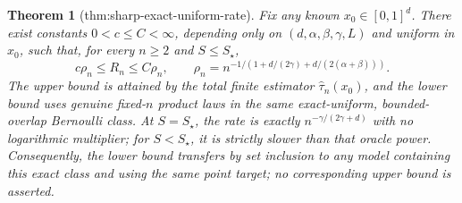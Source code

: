 \documentclass{article}
\newtheorem{theorem}{Theorem}
\begin{document}
\begin{theorem}[thm:sharp-exact-uniform-rate]\label{thm:sharp-exact-uniform-rate}
Fix any known \(x_0\in[0,1]^d\).  There exist constants \(0<c\le C<\infty\), depending only on \((d,\alpha,\beta,\gamma,L)\) and uniform in \(x_0\), such that, for every \(n\ge2\) and \(S\le S_\star\),
\[
c\rho_n\le R_n\le C\rho_n,\qquad
\rho_n=n^{-1/(1+d/(2\gamma)+d/(2(\alpha+\beta)))}.
\]
The upper bound is attained by the total finite estimator \(\widehat\tau_n(x_0)\), and the lower bound uses genuine fixed-\(n\) product laws in the same exact-uniform, bounded-overlap Bernoulli class.  At \(S=S_\star\), the rate is exactly \(n^{-\gamma/(2\gamma+d)}\) with no logarithmic multiplier; for \(S<S_\star\), it is strictly slower than that oracle power.  Consequently, the lower bound transfers by set inclusion to any model containing this exact class and using the same point target; no corresponding upper bound is asserted.
\end{theorem}
\end{document}
